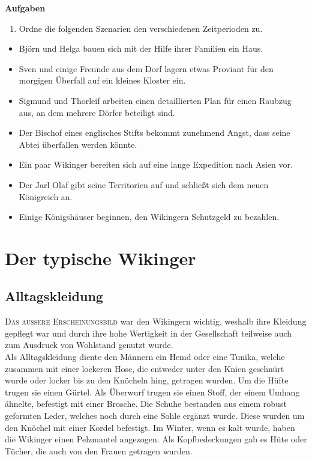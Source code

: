 \documentclass[12pt,a4paper,ngerman,openany]{book}
\newcommand{\flettrine}[2]{\lettrine[lines=2, depth=0, loversize=0.25, nindent=0.69pt, lraise=0.15]{\initfamily{#1}}{#2}}
\newcommand*\initfamily{\usefont{U}{GotIn}{xl}{n}}
\newcommand{\aufgaben}[1]{
  \begin{tcolorbox}
    \textbf{Aufgaben}
    \begin{enumerate}
      #1
    \end{enumerate}
  \end{tcolorbox}
} %
\newcommand{\fchapter}[1]{\chapter{#1}\thispagestyle{chapterstyle}}
\begin{document}
\vspace{0.66cm}

\aufgaben{
  \item Ordne die folgenden Szenarien den verschiedenen Zeitperioden zu.
}

\begin{itemize}
\item Björn und Helga bauen sich mit der Hilfe ihrer Familien ein Haus.
\item Sven und einige Freunde aus dem Dorf lagern etwas Proviant für den morgigen Überfall auf ein kleines Kloster ein.
\item Sigmund und Thorleif arbeiten einen detaillierten Plan für einen Raubzug aus, an dem mehrere Dörfer beteiligt sind.
\item Der Bischof eines englisches Stifts bekommt zunehmend Angst, dass seine Abtei überfallen werden könnte.
\item Ein paar Wikinger bereiten sich auf eine lange Expedition nach Asien vor.
\item Der Jarl Olaf gibt seine Territorien auf und schließt sich dem neuen Königreich an.
\item Einige Königshäuser beginnen, den Wikingern Schutzgeld zu bezahlen.
\end{itemize}

\fchapter{Der typische Wikinger}

\section{Alltagskleidung}
\flettrine{D}{Das äussere Erscheinungsbild} war den Wikingern wichtig, weshalb ihre Kleidung gepflegt war und durch ihre hohe Wertigkeit in der Gesellschaft teilweise auch zum Ausdruck von Wohlstand genutzt wurde.\\
Als Alltagskleidung diente den Männern ein Hemd oder eine Tunika, welche zusammen mit einer lockeren Hose, die entweder unter den Knien geschnürt wurde oder locker bis zu den Knöcheln hing, getragen wurden. Um die Hüfte trugen sie einen Gürtel. Als Überwurf trugen sie einen Stoff, der einem Umhang ähnelte, befestigt mit einer Brosche. Die Schuhe bestanden aus einem robust geformten Leder, welches noch durch eine Sohle ergänzt wurde. Diese wurden um den Knöchel mit einer Kordel befestigt. Im Winter, wenn es kalt wurde, haben die Wikinger einen Pelzmantel angezogen. Als Kopfbedeckungen gab es Hüte oder Tücher, die auch von den Frauen getragen wurden.
\end{document}
